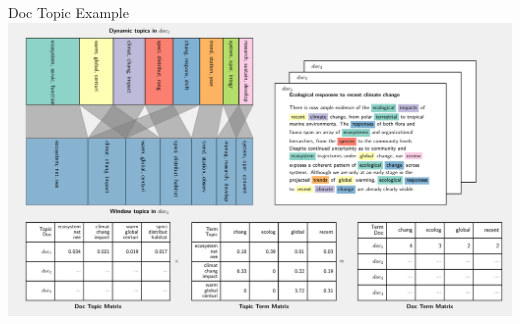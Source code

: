 \documentclass[9pt]{beamer}
\begin{document}


\begin{frame}{Doc Topic Example}
\includegraphics[width=\linewidth]{../plots/single_doc_3_ex.pdf}
\end{frame}

\end{document}
